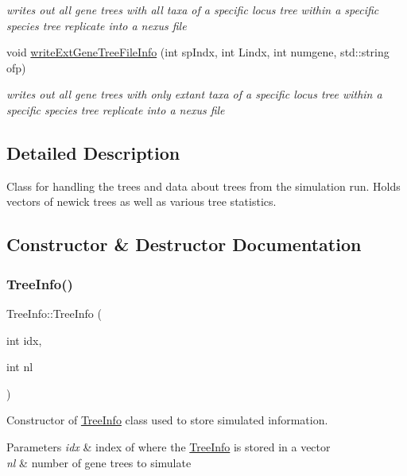 \begin{DoxyCompactItemize}
\begin{DoxyCompactList}\small\item\em writes out all gene trees with all taxa of a specific locus tree within a specific species tree replicate into a nexus file \end{DoxyCompactList}\item 
void \mbox{\hyperlink{class_tree_info_adcbbda0e1deadd68ae4f19d44a42b173}{write\+Ext\+Gene\+Tree\+File\+Info}} (int sp\+Indx, int Lindx, int numgene, std\+::string ofp)
\begin{DoxyCompactList}\small\item\em writes out all gene trees with only extant taxa of a specific locus tree within a specific species tree replicate into a nexus file \end{DoxyCompactList}\end{DoxyCompactItemize}


\subsection{Detailed Description}
Class for handling the trees and data about trees from the simulation run. Holds vectors of newick trees as well as various tree statistics. 



\subsection{Constructor \& Destructor Documentation}
\mbox{\label{class_tree_info_a2cab58c1fe56ca853e0c0798ea9ef0c8}} 
\subsubsection{\texorpdfstring{TreeInfo()}{TreeInfo()}}
{\footnotesize\ttfamily Tree\+Info\+::\+Tree\+Info (\begin{DoxyParamCaption}\item[{int}]{idx,  }\item[{int}]{nl }\end{DoxyParamCaption})}



Constructor of \mbox{\hyperlink{class_tree_info}{Tree\+Info}} class used to store simulated information. 


\begin{DoxyParams}{Parameters}
{\em idx} & index of where the \mbox{\hyperlink{class_tree_info}{Tree\+Info}} is stored in a vector \\
\hline
{\em nl} & number of gene trees to simulate \\
\hline
\end{DoxyParams}
\mbox{\label{class_tree_info_a76d5ab3c523122e76f727e1a3455ea3b}} 
